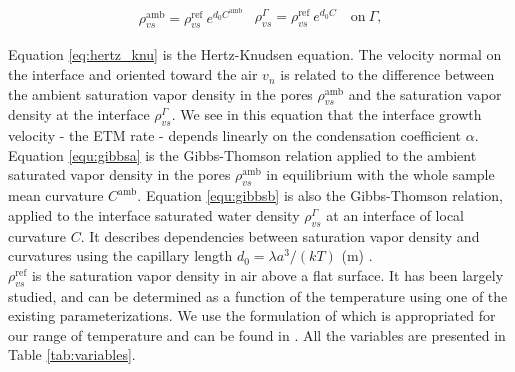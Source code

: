 \documentclass[draft,ms]{agujournal2019}
\begin{document}
\begin{subequations}
\begin{align}
\label{equ:gibbsa}
    \rho_{vs}^{\mathrm{amb}}=\rho_{vs}^{\mathrm{ref}}\ e^{d_0 C^{\mathrm{amb}}}
\end{align}
\begin{align}
\label{equ:gibbsb}
    \rho_{vs}^{\Gamma}=\rho_{vs}^{\mathrm{ref}}\ e^{d_0 C} \quad \text{on}\ \Gamma\text{,} 
\end{align}
\end{subequations}

\noindent Equation \eqref{eq:hertz_knu} is the Hertz-Knudsen equation. The velocity normal on the interface and oriented toward the air $v_n$ is related to the difference between the ambient saturation vapor density in the pores $\rho_{vs}^{\mathrm{amb}}$ and the saturation vapor density at the interface $\rho_{vs}^{\Gamma}$. We see in this equation that the interface growth velocity - the ETM rate - depends linearly on the condensation coefficient $\alpha$.\\

\noindent Equation \eqref{equ:gibbsa} is the Gibbs-Thomson relation applied to the ambient saturated vapor density in the pores $\rho_{vs}^{\mathrm{amb}}$ in equilibrium with the whole sample mean curvature $C^{\mathrm{amb}}$. Equation \eqref{equ:gibbsb} is also the Gibbs-Thomson relation, applied to the interface saturated water density $\rho_{vs}^{\Gamma}$ at an interface of local curvature $C$. It describes dependencies between saturation vapor density and curvatures using the capillary length $d_0 = \lambda a^3/(k T)$ (m) \cite{kaempfer_phase-field_2009}.\\ 
  
 \noindent $\rho_{vs}^\mathrm{ref}$ is the saturation vapor density in air above a flat surface. It has been largely studied, and can be determined as a function of the temperature using one of the existing parameterizations. We use the formulation of  which is appropriated for our range of temperature and can be found in . All the variables are presented in Table \ref{tab:variables}.
\end{document}
